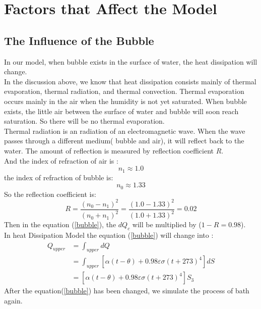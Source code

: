 \documentclass{mcmthesis}
\begin{document}
\section{Factors that Affect the Model}
\subsection{The Influence of the Bubble}
\indent In our model, when bubble exists in the surface of water, the heat dissipation will change.\\
\indent In the discussion above, we know that heat dissipation consists mainly of thermal evaporation, thermal radiation, and thermal convection. Thermal evaporation occurs mainly in the air when the humidity is not yet saturated. When bubble exists, the little air between the surface of water and bubble will soon reach saturation. So there will be no thermal evaporation.\\
\indent Thermal radiation is an radiation of an electromagnetic wave. When the wave passes through a different medium( bubble and air), it will reflect back to the water. The amount of reflection is measured by reflection coefficient $R$.\\
\indent And the index of refraction of air is :
\begin{equation}
n_{1}\approx 1.0
\end{equation}
\indent the index of refraction of bubble is: 
\begin{equation}
n_{0}\approx 1.33
\end{equation}
\indent So the reflection coefficient is: 
\begin{equation}
R=\frac{(n_{0}-n_{1})^{2}}{(n_{0}+n_{1})^{2}}=\frac{(1.0-1.33)^{2}}{(1.0+1.33)^2}=0.02
\end{equation}
\indent Then in the equation (\ref{bubble}), the $dQ_{c}$ will be multiplied by ($1-R=0.98$). \\
\indent In heat Dissipation Model the equation (\ref{bubble}) will change into :
\begin{equation}
\begin{split}
Q_{upper}&=\int_{upper}dQ\\
&=\int_{upper} [\alpha (t-\theta)+0.98\varepsilon \sigma (t+273)^{4}]dS\\
&=[\alpha (t-\theta)+0.98\varepsilon \sigma (t+273)^{4}]S_{3} 
\end{split}
\end{equation} 
\indent After the equation(\ref{bubble}) has been changed, we simulate the process of bath again.\\
\end{document}
